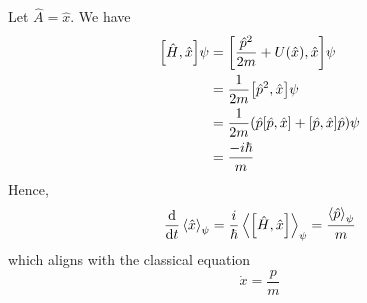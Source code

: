 \begin{example}
	Let \( \hat A = \hat x \).
	We have
	\begin{align*}
		\qty[\hat H, \hat x] \psi & = \qty[\frac{\hat p^2}{2m} + U(\hat x), \hat x] \psi                                 \\
		                          & = \frac{1}{2m} \qty[\hat p^2, \hat x] \psi                                           \\
		                          & = \frac{1}{2m} \qty( \hat p \qty[\hat p, \hat x] + \qty[\hat p, \hat x] \hat p) \psi \\
		                          & = \frac{-i\hbar}{m}
	\end{align*}
	Hence,
	\[
		\dv{t}\left\langle{\hat x}\right\rangle_\psi = \frac{i}{\hbar} \left\langle{\qty[\hat H, \hat x]}\right\rangle_\psi = \frac{\left\langle{\hat p}\right\rangle_\psi}{m}
	\]
	which aligns with the classical equation
	\[
		\dot x = \frac{p}{m}
	\]
\end{example}
